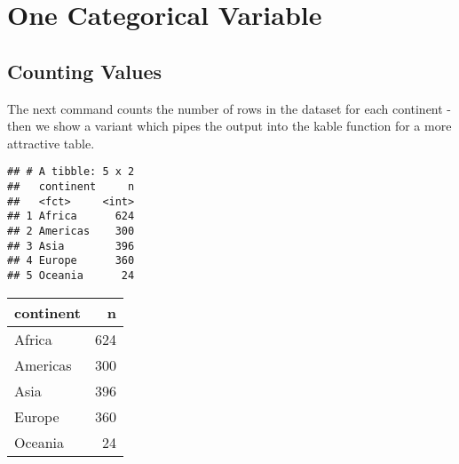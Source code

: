 \documentclass[
]{book}
\newenvironment{Shaded}{\begin{snugshade}}{\end{snugshade}}
\newcommand{\CommentTok}[1]{\textcolor[rgb]{0.56,0.35,0.01}{\textit{#1}}}
\newcommand{\DataTypeTok}[1]{\textcolor[rgb]{0.13,0.29,0.53}{#1}}
\newcommand{\KeywordTok}[1]{\textcolor[rgb]{0.13,0.29,0.53}{\textbf{#1}}}
\newcommand{\NormalTok}[1]{#1}
\newcommand{\OperatorTok}[1]{\textcolor[rgb]{0.81,0.36,0.00}{\textbf{#1}}}
\newcommand{\OtherTok}[1]{\textcolor[rgb]{0.56,0.35,0.01}{#1}}
\newcommand{\StringTok}[1]{\textcolor[rgb]{0.31,0.60,0.02}{#1}}
\begin{document}
\hypertarget{one-categorical-variable}{%
\section{One Categorical Variable}\label{one-categorical-variable}}

\hypertarget{counting-values}{%
\subsection{Counting Values}\label{counting-values}}

The next command counts the number of rows in the dataset for each continent - then we show a variant which pipes the output into the kable function for a more attractive table.

\begin{Shaded}
\end{Shaded}

\begin{verbatim}
## # A tibble: 5 x 2
##   continent     n
##   <fct>     <int>
## 1 Africa      624
## 2 Americas    300
## 3 Asia        396
## 4 Europe      360
## 5 Oceania      24
\end{verbatim}

\begin{Shaded}
\end{Shaded}

\begin{tabular}{l|r}
\hline
continent & n\\
\hline
Africa & 624\\
\hline
Americas & 300\\
\hline
Asia & 396\\
\hline
Europe & 360\\
\hline
Oceania & 24\\
\hline
\end{tabular}

\begin{Shaded}
\end{Shaded}
\end{document}
